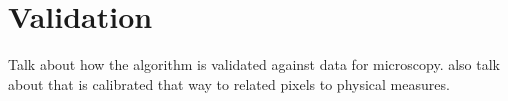 \section{Validation}
Talk about how the algorithm is validated against data for microscopy. also talk about that is calibrated that way to related pixels to physical measures.

\blindtext[1]



\blindtext[1]



\blindtext[1]



\blindtext[1]